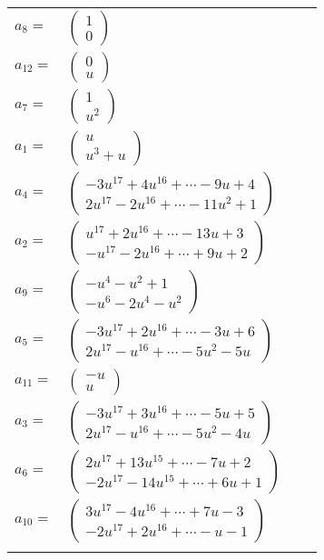 \documentclass[1p]{elsarticle_modified}
\theoremstyle{definition}
\begin{document}
\begin{tabular}{m{7pt} m{180pt} m{7pt} m{180pt} }
\flushright $a_{8}=$&$\begin{pmatrix}1\\0\end{pmatrix}$ \\
\flushright $a_{12}=$&$\begin{pmatrix}0\\u\end{pmatrix}$ \\
\flushright $a_{7}=$&$\begin{pmatrix}1\\u^2\end{pmatrix}$ \\
\flushright $a_{1}=$&$\begin{pmatrix}u\\u^3+u\end{pmatrix}$ \\
\flushright $a_{4}=$&$\begin{pmatrix}-3 u^{17}+4 u^{16}+\cdots-9 u+4\\2 u^{17}-2 u^{16}+\cdots-11 u^2+1\end{pmatrix}$ \\
\flushright $a_{2}=$&$\begin{pmatrix}u^{17}+2 u^{16}+\cdots-13 u+3\\- u^{17}-2 u^{16}+\cdots+9 u+2\end{pmatrix}$ \\
\flushright $a_{9}=$&$\begin{pmatrix}- u^4- u^2+1\\- u^6-2 u^4- u^2\end{pmatrix}$ \\
\flushright $a_{5}=$&$\begin{pmatrix}-3 u^{17}+2 u^{16}+\cdots-3 u+6\\2 u^{17}- u^{16}+\cdots-5 u^2-5 u\end{pmatrix}$ \\
\flushright $a_{11}=$&$\begin{pmatrix}- u\\u\end{pmatrix}$ \\
\flushright $a_{3}=$&$\begin{pmatrix}-3 u^{17}+3 u^{16}+\cdots-5 u+5\\2 u^{17}- u^{16}+\cdots-5 u^2-4 u\end{pmatrix}$ \\
\flushright $a_{6}=$&$\begin{pmatrix}2 u^{17}+13 u^{15}+\cdots-7 u+2\\-2 u^{17}-14 u^{15}+\cdots+6 u+1\end{pmatrix}$ \\
\flushright $a_{10}=$&$\begin{pmatrix}3 u^{17}-4 u^{16}+\cdots+7 u-3\\-2 u^{17}+2 u^{16}+\cdots- u-1\end{pmatrix}$\\&\end{tabular}
\end{document}
